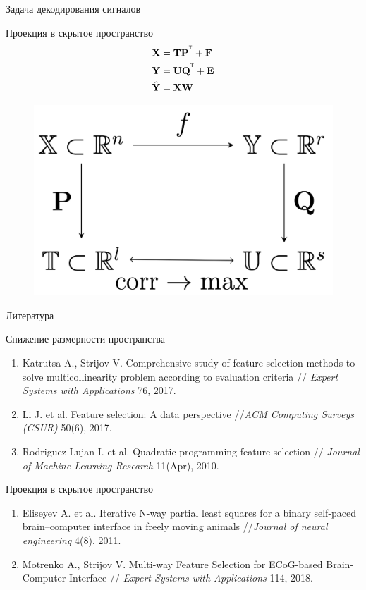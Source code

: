\documentclass[9pt]{beamer}
\newcommand{\bE}{\mathbf{E}}
\newcommand{\bF}{\mathbf{F}}
\newcommand{\bP}{\mathbf{P}}
\newcommand{\bQ}{\mathbf{Q}}
\newcommand{\bT}{\mathbf{T}}
\newcommand{\bU}{\mathbf{U}}
\newcommand{\bW}{\mathbf{W}}
\newcommand{\bX}{\mathbf{X}}
\newcommand{\bY}{\mathbf{Y}}
\newcommand{\T}{^{\text{\tiny\sffamily\upshape\mdseries T}}}
\begin{document}
\begin{frame}{Задача декодирования сигналов}
\begin{minipage}{.5\linewidth}
	\end{minipage}%
	\begin{minipage}{.5\linewidth}
		\begin{block}{Проекция в скрытое пространство}
			\vspace{-0.4cm}
			\begin{align*}
				\bX &= \bT \bP^{\T} + \bF \\
				\bY &= \bU \bQ^{\T} + \bE \\
				\hat{\bY} &= \bX \bW
			\end{align*}
		\vspace{-0.4cm}
			\begin{figure}
				\includegraphics[width=0.65\linewidth]{figs/slide3_2}
			\end{figure}
		\end{block}
	\end{minipage}

\end{frame}
\begin{frame}{Литература}
	\begin{block}{Снижение размерности пространства}
	\begin{enumerate}
		\item Katrutsa A., Strijov V. Comprehensive study of feature selection methods to solve multicollinearity problem according to evaluation criteria // \textit{Expert Systems with Applications} 76, 2017.
		\item Li J. et al. Feature selection: A data perspective //\textit{ACM Computing Surveys (CSUR)} 50(6), 2017.
		\item Rodriguez-Lujan I. et al. Quadratic programming feature selection // \textit{Journal of Machine Learning Research} 11(Apr), 2010.
	\end{enumerate}
	\end{block}
	\begin{block}{Проекция в скрытое пространство}
	\begin{enumerate}
		\item Eliseyev A. et al. Iterative N-way partial least squares for a binary self-paced brain–computer interface in freely moving animals //\textit{Journal of neural engineering} 4(8), 2011.
		\item Motrenko A., Strijov V. Multi-way Feature Selection for ECoG-based Brain-Computer Interface // \textit{Expert Systems with Applications} 114, 2018.
	\end{enumerate}
	\end{block}
\end{frame}
\end{document}
